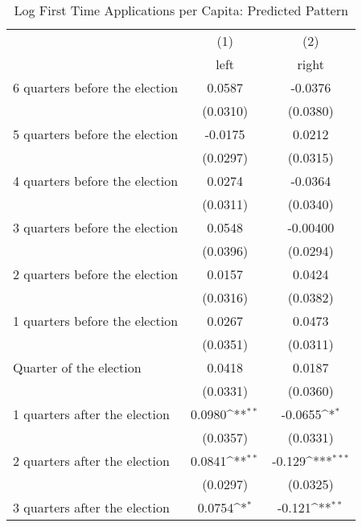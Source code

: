 \begin{table}[htbp]\centering
\def\sym#1{\ifmmode^{#1}\else\(^{#1}\)\fi}
\caption{Log First Time Applications per Capita: Predicted Pattern}
\begin{tabular}{l*{2}{c}}
\hline\hline
                    &\multicolumn{1}{c}{(1)}&\multicolumn{1}{c}{(2)}\\
                    &\multicolumn{1}{c}{left}&\multicolumn{1}{c}{right}\\
\hline
 6 quarters before the election&      0.0587         &     -0.0376         \\
                    &    (0.0310)         &    (0.0380)         \\
[1em]
 5 quarters before the election&     -0.0175         &      0.0212         \\
                    &    (0.0297)         &    (0.0315)         \\
[1em]
 4 quarters before the election&      0.0274         &     -0.0364         \\
                    &    (0.0311)         &    (0.0340)         \\
[1em]
 3 quarters before the election&      0.0548         &    -0.00400         \\
                    &    (0.0396)         &    (0.0294)         \\
[1em]
 2 quarters before the election&      0.0157         &      0.0424         \\
                    &    (0.0316)         &    (0.0382)         \\
[1em]
 1 quarters before the election&      0.0267         &      0.0473         \\
                    &    (0.0351)         &    (0.0311)         \\
[1em]
Quarter of the election&      0.0418         &      0.0187         \\
                    &    (0.0331)         &    (0.0360)         \\
[1em]
 1 quarters after the election&      0.0980\sym{**} &     -0.0655\sym{*}  \\
                    &    (0.0357)         &    (0.0331)         \\
[1em]
 2 quarters after the election&      0.0841\sym{**} &      -0.129\sym{***}\\
                    &    (0.0297)         &    (0.0325)         \\
[1em]
 3 quarters after the election&      0.0754\sym{*}  &      -0.121\sym{**} \\

\end{tabular}
\end{table}
